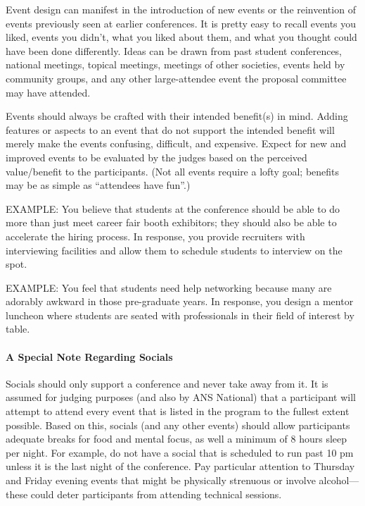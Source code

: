 \documentclass[12pt]{article}
\begin{document}
Event design can manifest in the introduction of new events or the reinvention of events
previously seen at earlier conferences. It is pretty easy to recall events you liked, events you didn’t, what you liked about them, and what you thought could have been done
differently. Ideas can be drawn from past student conferences, national meetings, topical
meetings, meetings of other societies, events held by community groups, and any other
large-attendee event the proposal committee may have attended.

Events should always be crafted with their intended benefit(s) in mind. Adding features or aspects to an event that do not support the intended benefit will merely make the events confusing, difficult, and expensive. Expect for new and improved events to be
evaluated by the judges based on the perceived value/benefit to the participants. (Not all events require a lofty goal; benefits may be as simple as “attendees have fun”.)

EXAMPLE: You believe that students at the conference should be able to do more than just meet career fair booth exhibitors; they should also be able to accelerate the hiring process. In response, you provide recruiters with interviewing facilities and allow them to schedule students to interview on the spot.


EXAMPLE: You feel that students need help networking because many are adorably awkward in those pre-graduate years. In response, you design a mentor luncheon where students are seated with professionals in their field of interest by table.

\paragraph{A Special Note Regarding Socials}
Socials should only support a conference and never take away from it. It is assumed for
judging purposes (and also by ANS National) that a participant will attempt to attend every
event that is listed in the program to the fullest extent possible. Based on this, socials (and any
other events) should allow participants adequate breaks for food and mental focus, as
well a minimum of 8 hours sleep per night. For example, do not have a social that is
scheduled to run past 10 pm unless it is the last night of the conference. Pay particular
attention to Thursday and Friday evening events that might be physically strenuous or
involve alcohol---these could deter participants from attending technical sessions.
\end{document}
